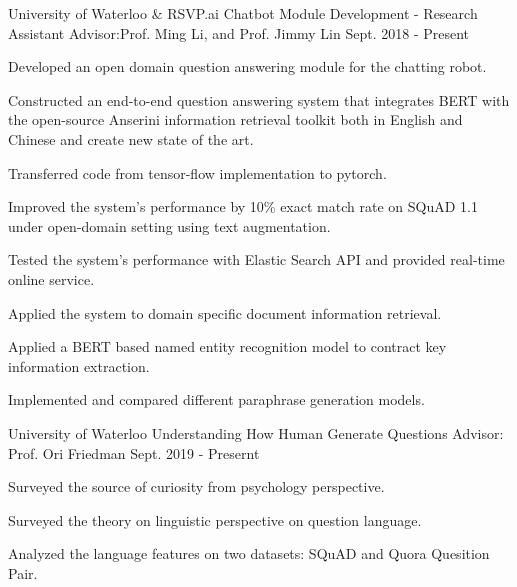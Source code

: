 

\begin{cventries}


 \cventry
    {University of Waterloo \& RSVP.ai}
    {Chatbot Module Development - Research Assistant} %
    {Advisor:Prof. Ming Li, and Prof. Jimmy Lin} %
    {Sept. 2018 - Present} %
    {
      \begin{cvitems} %
        \item {Developed an open domain question answering module for the chatting robot.}
        \item {Constructed an end-to-end question answering system that integrates BERT with the open-source Anserini information retrieval toolkit both in English and Chinese and create new state of the art.}
        \item {Transferred code from tensor-flow implementation to pytorch.}
        \item {Improved the system's performance by 10\% exact match rate on SQuAD 1.1 under open-domain setting using text augmentation.}
	\item {Tested the system's performance with Elastic Search API and provided real-time online service.}
        \item {Applied the system to domain specific document information retrieval.}
        \item {Applied a BERT based named entity recognition model to contract key information extraction.}
         \item {Implemented and compared different paraphrase generation models.}
      \end{cvitems}
    }
 
   \cventry
    {University of Waterloo}
    {Understanding How Human Generate Questions } %
    {Advisor: Prof. Ori Friedman} %
    {Sept. 2019 - Presernt} %
    {
      \begin{cvitems} %
        \item {Surveyed the source of curiosity from psychology perspective.}
        \item {Surveyed the theory on linguistic perspective on question language.}
        \item {Analyzed the language features on two datasets: SQuAD and Quora Quesition Pair. }
      \end{cvitems}
    }
    

\end{cventries}
